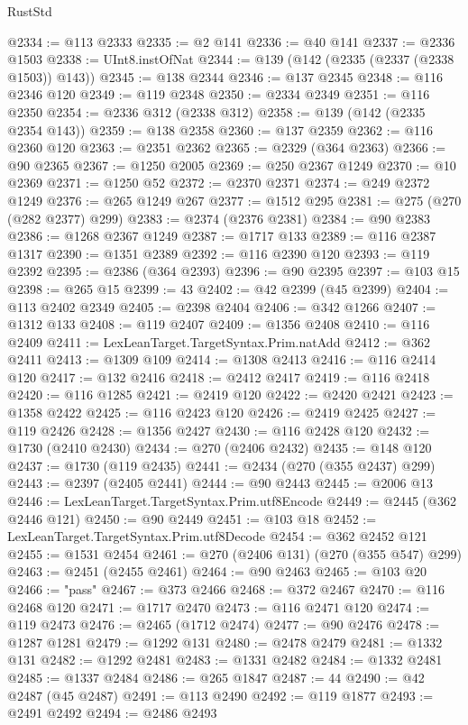 \begin{lexlean}{RustStd}
\begin{coremodule}
@2334 := @113 @2333
@2335 := @2 @141
@2336 := @40 @141
@2337 := @2336 @1503
@2338 := UInt8.instOfNat
@2344 := @139 (@142 (@2335 (@2337 (@2338 @1503)) @143))
@2345 := @138 @2344
@2346 := @137 @2345
@2348 := @116 @2346 @120
@2349 := @119 @2348
@2350 := @2334 @2349
@2351 := @116 @2350
@2354 := @2336 @312 (@2338 @312)
@2358 := @139 (@142 (@2335 @2354 @143))
@2359 := @138 @2358
@2360 := @137 @2359
@2362 := @116 @2360 @120
@2363 := @2351 @2362
@2365 := @2329 (@364 @2363)
@2366 := @90 @2365
@2367 := @1250 @2005
@2369 := @250 @2367 @1249
@2370 := @10 @2369
@2371 := @1250 @52
@2372 := @2370 @2371
@2374 := @249 @2372 @1249
@2376 := @265 @1249 @267
@2377 := @1512 @295
@2381 := @275 (@270 (@282 @2377) @299)
@2383 := @2374 (@2376 @2381)
@2384 := @90 @2383
@2386 := @1268 @2367 @1249
@2387 := @1717 @133
@2389 := @116 @2387 @1317
@2390 := @1351 @2389
@2392 := @116 @2390 @120
@2393 := @119 @2392
@2395 := @2386 (@364 @2393)
@2396 := @90 @2395
@2397 := @103 @15
@2398 := @265 @15
@2399 := 43
@2402 := @42 @2399 (@45 @2399)
@2404 := @113 @2402 @2349
@2405 := @2398 @2404
@2406 := @342 @1266
@2407 := @1312 @133
@2408 := @119 @2407
@2409 := @1356 @2408
@2410 := @116 @2409
@2411 := LexLeanTarget.TargetSyntax.Prim.natAdd
@2412 := @362 @2411
@2413 := @1309 @109
@2414 := @1308 @2413
@2416 := @116 @2414 @120
@2417 := @132 @2416
@2418 := @2412 @2417
@2419 := @116 @2418
@2420 := @116 @1285
@2421 := @2419 @120
@2422 := @2420 @2421
@2423 := @1358 @2422
@2425 := @116 @2423 @120
@2426 := @2419 @2425
@2427 := @119 @2426
@2428 := @1356 @2427
@2430 := @116 @2428 @120
@2432 := @1730 (@2410 @2430)
@2434 := @270 (@2406 @2432)
@2435 := @148 @120
@2437 := @1730 (@119 @2435)
@2441 := @2434 (@270 (@355 @2437) @299)
@2443 := @2397 (@2405 @2441)
@2444 := @90 @2443
@2445 := @2006 @13
@2446 := LexLeanTarget.TargetSyntax.Prim.utf8Encode
@2449 := @2445 (@362 @2446 @121)
@2450 := @90 @2449
@2451 := @103 @18
@2452 := LexLeanTarget.TargetSyntax.Prim.utf8Decode
@2454 := @362 @2452 @121
@2455 := @1531 @2454
@2461 := @270 (@2406 @131) (@270 (@355 @547) @299)
@2463 := @2451 (@2455 @2461)
@2464 := @90 @2463
@2465 := @103 @20
@2466 := "pass"
@2467 := @373 @2466
@2468 := @372 @2467
@2470 := @116 @2468 @120
@2471 := @1717 @2470
@2473 := @116 @2471 @120
@2474 := @119 @2473
@2476 := @2465 (@1712 @2474)
@2477 := @90 @2476
@2478 := @1287 @1281
@2479 := @1292 @131
@2480 := @2478 @2479
@2481 := @1332 @131
@2482 := @1292 @2481
@2483 := @1331 @2482
@2484 := @1332 @2481
@2485 := @1337 @2484
@2486 := @265 @1847
@2487 := 44
@2490 := @42 @2487 (@45 @2487)
@2491 := @113 @2490
@2492 := @119 @1877
@2493 := @2491 @2492
@2494 := @2486 @2493

\end{coremodule}
\end{lexlean}
